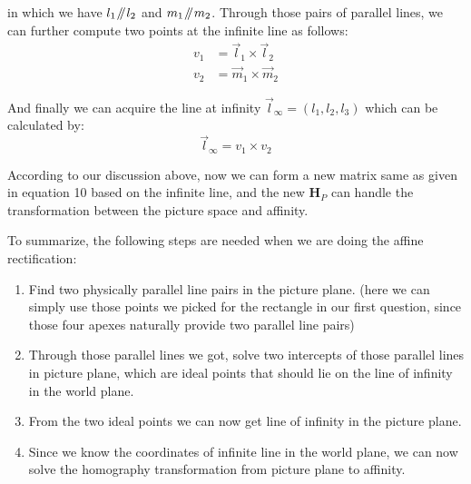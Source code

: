 \documentclass[conference]{IEEEtran}
\let\oldvec\vec
\renewcommand{\vec}[1]{\oldvec{\mathit{#1}}}
\newcommand{\mat}[1]{\mathbf{#1}} %
\newcommand{\parallelsum}{\mathbin{\!/\mkern-5mu/\!}}
\begin{document}
\noindent in which we have $l_1\parallelsum l_2$ and $m_1\parallelsum m_2$. Through those pairs of parallel lines, we can further compute two points at the infinite line as follows:
\begin{equation}
\begin{split}
	v_1 &= \vec{l}_1\times \vec{l}_2\\
	v_2 &= \vec{m}_1 \times \vec{m}_2
\end{split}
\end{equation}

\noindent And finally we can acquire the line at infinity $\vec{l}_{\infty} = (l_1, l_2, l_3)$ which can be calculated by:
\begin{equation}
	\vec{l}_{\infty} = v_1 \times v_2
\end{equation}

\noindent According to our discussion above, now we can form a new matrix same as given in equation 10 based on the infinite line, and the new $\mat{H}_P$ can handle the transformation between the picture space and affinity.

To summarize, the following steps are needed when we are doing the affine rectification:
\begin{enumerate}
	\item Find two physically parallel line pairs in the picture plane. (here we can simply use those points we picked for the rectangle in our first question, since those four apexes naturally provide two parallel line pairs)
	\item Through those parallel lines we got, solve two intercepts of those parallel lines in picture plane, which are ideal points that should lie on the line of infinity in the world plane.
	\item From the two ideal points we can now get line of infinity in the picture plane.
	\item Since we know the coordinates of infinite line in the world plane, we can now solve the homography transformation from picture plane to affinity.
\end{enumerate}
\end{document}
